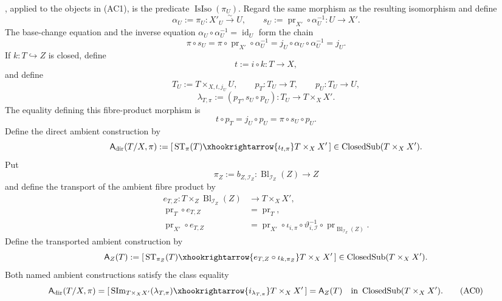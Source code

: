 \begin{lemma}
  , applied to the objects in
  (AC1), is the predicate $\operatorname{IsIso}(\pi_U)$.  Regard the same
  morphism as the resulting isomorphism and define
  \[
    \alpha_U:=\pi_U\colon X'_U\xrightarrow{\sim}U,
    \qquad
    s_U:=\operatorname{pr}_{X'}\circ\alpha_U^{-1}\colon U\to X'.
  \]
  The base-change equation and the inverse equation
  $\alpha_U\circ\alpha_U^{-1}=\operatorname{id}_U$ form the chain
  \[
    \pi\circ s_U
      =\pi\circ\operatorname{pr}_{X'}\circ\alpha_U^{-1}
      =j_U\circ\alpha_U\circ\alpha_U^{-1}
      =j_U.                                                       \tag{AC2}
  \]
  If $k\colon T\hookrightarrow Z$ is closed, define
  \[
    t:=i\circ k\colon T\to X,
  \]
  and define
  \[
    T_U:=T\times_{X,t,j_U}U,\qquad
    p_T\colon T_U\to T,\qquad p_U\colon T_U\to U,
  \]
  \[
    \lambda_{T,\pi}:=
      (p_T,s_U\circ p_U)
      \colon T_U\to T\times_XX'.
  \]
  The equality defining this fibre-product morphism is
  \[
    t\circ p_T=j_U\circ p_U
      =\pi\circ s_U\circ p_U.                                   \tag{AC3}
  \]
  Define the direct ambient construction by
  \[
    \mathsf A_{\mathrm{dir}}(T/X,\pi):=
      [\,\operatorname{ST}_\pi(T)
        \xhookrightarrow{\iota_{t,\pi}}T\times_XX'\,]
      \in\operatorname{ClosedSub}(T\times_XX').
  \]
  Put
  \[
    \pi_Z:=b_{Z,\mathcal I_Z}\colon
      \operatorname{Bl}_{\mathcal I_Z}(Z)\to Z
  \]
  and define the transport of the ambient fibre product by
  \[
  \begin{aligned}
    e_{T,Z}\colon
      T\times_Z\operatorname{Bl}_{\mathcal I_Z}(Z)
        &\longrightarrow T\times_XX',\\
    \operatorname{pr}_T\circ e_{T,Z}
      &=\operatorname{pr}_T,\\
    \operatorname{pr}_{X'}\circ e_{T,Z}
      &=\operatorname{pr}_{X'}\circ\iota_{i,\pi}\circ
        \vartheta_{i,\mathcal I}^{-1}\circ
        \operatorname{pr}_{\operatorname{Bl}_{\mathcal I_Z}(Z)}.
  \end{aligned}                                                   \tag{AC4}
  \]
  Define the transported ambient construction by
  \[
    \mathsf A_Z(T):=
      [\,\operatorname{ST}_{\pi_Z}(T)
        \xhookrightarrow{e_{T,Z}\circ\iota_{k,\pi_Z}}
          T\times_XX'\,]
      \in\operatorname{ClosedSub}(T\times_XX').
  \]
  Both named ambient constructions satisfy the class equality
  \[
    \mathsf A_{\mathrm{dir}}(T/X,\pi)
      =[\,\operatorname{SIm}_{T\times_XX'}(\lambda_{T,\pi})
        \xhookrightarrow{i_{\lambda_{T,\pi}}}T\times_XX'\,]
      =\mathsf A_Z(T)
      \quad\text{in }\operatorname{ClosedSub}(T\times_XX').    \tag{AC0}
  \]
\end{lemma}

